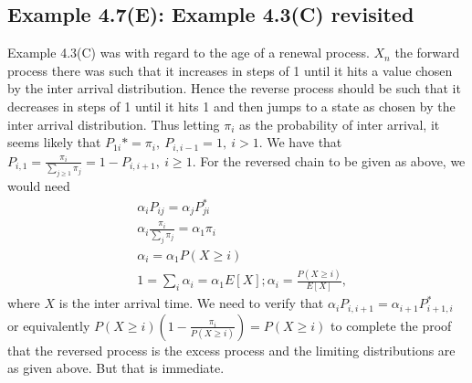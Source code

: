 \documentclass[a4paper,10pt,english]{article}
\begin{document}
\subsection{Example 4.7(E): Example 4.3(C) revisited}
Example 4.3(C) was with regard to the age of a renewal process. $X_n$ the forward process there was such that it increases in steps of 1 until it hits a value chosen by the inter arrival distribution. Hence the reverse process should be such that it decreases in steps of 1 until it hits 1 and then jumps to a state as chosen by the inter arrival distribution. Thus letting $\pi_i$ as the probability of inter arrival, it seems likely that  $P_{1i}*=\pi_i, ~ P_{i,i-1}=1,~ i > 1$. We have that $P_{i,1}=\frac{\pi_i}{\sum_{j \geq 1}\pi_j}=1-P_{i,i+1}, ~ i \geq 1$. For the reversed chain to be given as above, we would need 
\begin{align*}
&\alpha_i P_{ij}=\alpha_j P_{ji}^*\\
&\alpha_i \frac{\pi_i}{\sum_j \pi_j}=\alpha_1 \pi_i\\
&\alpha_i=\alpha_1 P(X \geq i)\\
&1=\sum_i \alpha_i=\alpha_1 E[X]; \alpha_i=\frac{P(X \geq i)}{E[X]}, 
\end{align*}
where $X$ is the inter arrival time. We need to verify that $\alpha_i P_{i,i+1}=\alpha_{i+1}P^*_{i+1,i}$ or equivalently $P(X \geq i)(1-\frac{\pi_i}{P(X \geq i)})=P(X \geq i)$ to complete the proof that the reversed process is the excess process and the limiting distributions are as given above. But that is immediate.
\end{document}
